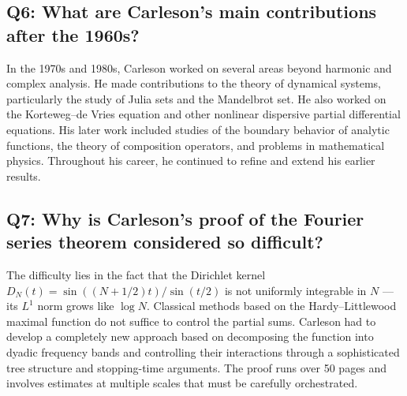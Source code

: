 \subsection*{Q6: What are Carleson's main contributions after the 1960s?}

In the 1970s and 1980s, Carleson worked on several areas beyond harmonic and complex analysis. He made contributions to the theory of dynamical systems, particularly the study of Julia sets and the Mandelbrot set. He also worked on the Korteweg--de Vries equation and other nonlinear dispersive partial differential equations. His later work included studies of the boundary behavior of analytic functions, the theory of composition operators, and problems in mathematical physics. Throughout his career, he continued to refine and extend his earlier results.

\subsection*{Q7: Why is Carleson's proof of the Fourier series theorem considered so difficult?}

The difficulty lies in the fact that the Dirichlet kernel \(D_N(t) = \sin((N+1/2)t)/\sin(t/2)\) is not uniformly integrable in \(N\) --- its \(L^1\) norm grows like \(\log N\). Classical methods based on the Hardy--Littlewood maximal function do not suffice to control the partial sums. Carleson had to develop a completely new approach based on decomposing the function into dyadic frequency bands and controlling their interactions through a sophisticated tree structure and stopping-time arguments. The proof runs over 50 pages and involves estimates at multiple scales that must be carefully orchestrated.

